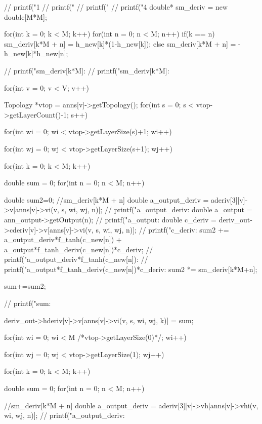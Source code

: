 {  // printf("1%
  // printf("%
  // printf("%
  // printf("4%
  double* sm\_deriv = new double[M*M];


  for(int k = 0; k < M; k++)
    for(int n = 0; n < M; n++)
      if(k == n) sm\_deriv[k*M + n] = h\_new[k]*(1-h\_new[k]);
      else sm\_deriv[k*M + n] = -h\_new[k]*h\_new[n];

      // printf("sm\_deriv[k*M]: %
      // printf("sm\_deriv[k*M]: %

      for(int v = 0; v < V; v++){
        Topology *vtop = anns[v]->getTopology();
        for(int s = 0; s < vtop->getLayerCount()-1; s++){
          for(int wi = 0; wi < vtop->getLayerSize(s)+1; wi++){
            for(int wj = 0; wj < vtop->getLayerSize(s+1); wj++){
              for(int k = 0; k < M; k++){
                double sum = 0;
                for(int n = 0; n < M; n++){
                  double sum2=0;
                  //sm\_deriv[k*M + n]
                  double a\_output\_deriv = aderiv[3][v]->v[anns[v]->vi(v, s, wi, wj, n)];
                  // printf("a\_output\_deriv: %
                  double a\_output = ann\_output->getOutput(n);
                  // printf("a\_output: %
                  double c\_deriv = deriv\_out->cderiv[v]->v[anns[v]->vi(v, s, wi, wj, n)];
                  // printf("c\_deriv: %
                  sum2 += a\_output\_deriv*f\_tanh(c\_new[n]) + a\_output*f\_tanh\_deriv(c\_new[n])*c\_deriv;
                  // printf("a\_output\_deriv*f\_tanh(c\_new[n]): %
                  // printf("a\_output*f\_tanh\_deriv(c\_new[n])*c\_deriv: %
                  sum2 *= sm\_deriv[k*M+n];

                  sum+=sum2;

                  // printf("sum: %
                }
                deriv\_out->hderiv[v]->v[anns[v]->vi(v, s, wi, wj, k)] = sum;

              }
            }
          }
        }


        for(int wi = 0; wi < M /*vtop->getLayerSize(0)*/; wi++){
          for(int wj = 0; wj < vtop->getLayerSize(1); wj++){
            for(int k = 0; k < M; k++){
              double sum = 0;
              for(int n = 0; n < M; n++){
                //sm\_deriv[k*M + n]
                double a\_output\_deriv = aderiv[3][v]->vh[anns[v]->vhi(v, wi, wj, n)];
                // printf("a\_output\_deriv:%

}}}}}}
